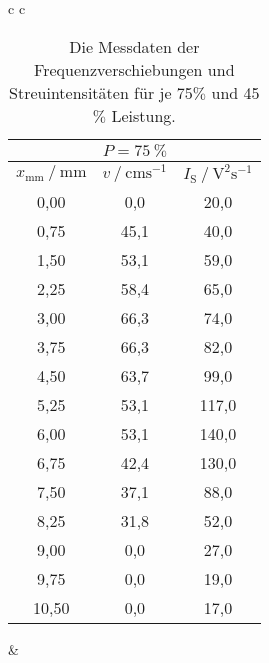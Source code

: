 \begin{table}[H]
  \centering
  \caption{Die Messdaten der Frequenzverschiebungen und Streuintensitäten für je 75$\%$ und 45$\%$ Leistung.}
  \label{tab:profil}

  \begin{tabular}{c c}   %
      \begin{tabular}{c c c} 
          \hline
          \toprule
           & $P = \qty{75}{\percent}$ & \\
          \midrule
          $x_\text{mm} \mathbin{/} \unit{\milli\meter}$ &
          $v \mathbin{/} \mathrm{cm s^{-1}}$ &
          $I_\text{S} \mathbin{/} \mathrm{V^2 s^{-1}}$ \\
          \midrule
          0,00 &  0,0 &  20,0 \\
          0,75 & 45,1 &  40,0 \\
          1,50 & 53,1 &  59,0 \\
          2,25 & 58,4 &  65,0 \\
          3,00 & 66,3 &  74,0 \\
          3,75 & 66,3 &  82,0 \\
          4,50 & 63,7 &  99,0 \\
          5,25 & 53,1 & 117,0 \\
          6,00 & 53,1 & 140,0 \\
          6,75 & 42,4 & 130,0 \\
          7,50 & 37,1 &  88,0 \\
          8,25 & 31,8 &  52,0 \\
          9,00 &  0,0 &  27,0 \\
          9,75 &  0,0 &  19,0 \\
         10,50 &  0,0 &  17,0 \\
 
          \bottomrule
          \hline
      \end{tabular} &  %


\end{tabular}
\end{table}
